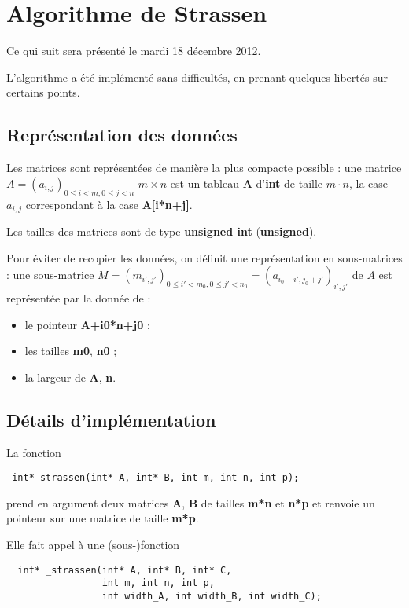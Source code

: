 \documentclass[a4paper]{article}
\begin{document}
\section{Algorithme de Strassen}

Ce qui suit sera présenté le mardi 18 décembre 2012.

L'algorithme a été implémenté sans difficultés, en prenant quelques
libertés sur certains points.

\subsection{Représentation des données}

Les matrices sont représentées de manière la plus compacte possible :
une matrice $A=(a_{i,j})_{0 \leq i < m, 0 \leq j < n}$ $m \times n$ est
un tableau {\bf A} d'{\bf int} de taille $m \cdot n$,
la case $a_{i,j}$ correspondant à la case {\bf A[i*n+j]}.

Les tailles des matrices sont de type {\bf unsigned int} ({\bf unsigned}).

Pour éviter de recopier les données, on définit une représentation en
sous-matrices :
une sous-matrice
$M = (m_{i',j'})_{0 \leq i' < m_0, 0 \leq j' < n_0} =
(a_{i_0+i',j_0+j'})_{i',j'}$
de $A$ est représentée par la donnée de :

\begin{itemize}
  \item le pointeur {\bf A+i0*n+j0} ;
  \item les tailles {\bf m0}, {\bf n0} ;
  \item la largeur de {\bf A}, {\bf n}.
\end{itemize}

\subsection{Détails d'implémentation}

La fonction

\begin{verbatim}
 int* strassen(int* A, int* B, int m, int n, int p);
\end{verbatim}

prend en argument deux matrices {\bf A}, {\bf B} de tailles {\bf m*n} et
{\bf n*p} et renvoie un pointeur sur une matrice de taille {\bf m*p}.

Elle fait appel à une (sous-)fonction

\begin{verbatim}
  int* _strassen(int* A, int* B, int* C,
                 int m, int n, int p,
                 int width_A, int width_B, int width_C);
\end{verbatim}
\end{document}
